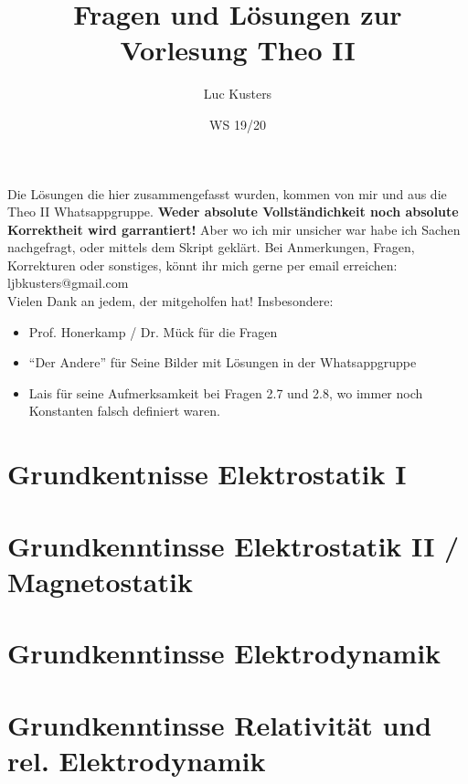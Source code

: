 \documentclass{scrartcl}
\title{Fragen und Lösungen zur Vorlesung Theo II}
\author{Luc Kusters}
\date{WS 19/20}
\newcommand{\subdir}{subtex}
\begin{document}
\maketitle

\noindent
Die Lösungen die hier zusammengefasst wurden, kommen von mir und
aus die Theo II Whatsappgruppe. 
\textbf{Weder absolute Vollständichkeit noch absolute Korrektheit wird garrantiert!} Aber wo ich mir unsicher war habe ich Sachen nachgefragt, oder 
mittels dem Skript geklärt.
Bei Anmerkungen, Fragen, Korrekturen oder sonstiges, könnt ihr mich gerne 
per email erreichen:\\ 
ljbkusters@gmail.com \\

\noindent
Vielen Dank an jedem, der mitgeholfen hat! Insbesondere:
\begin{itemize}
  \item Prof. Honerkamp / Dr. Mück für die Fragen
  \item ``Der Andere'' für Seine Bilder mit Lösungen in der Whatsappgruppe
  \item Lais für seine Aufmerksamkeit bei Fragen 2.7 und 2.8, wo immer noch Konstanten falsch definiert waren.
\end{itemize}

\clearpage
\newpage
\setcounter{page}{1}
\tableofcontents
\newpage

\section{Grundkentnisse Elektrostatik I}

\newpage
\section{Grundkenntinsse Elektrostatik II / Magnetostatik}

\newpage
\section{Grundkenntinsse Elektrodynamik}

\newpage
\section{Grundkenntinsse Relativität und rel. Elektrodynamik}

\end{document}
